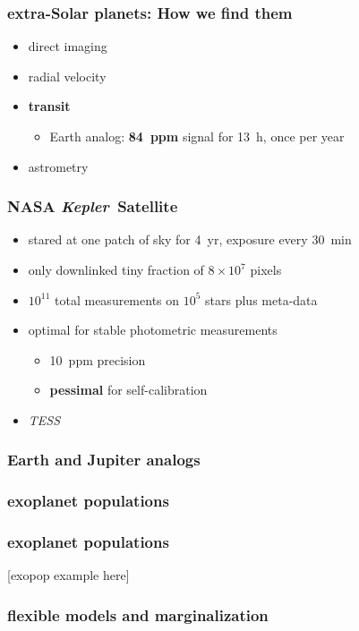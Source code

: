 \documentclass{beamer}
\renewcommand{\emph}[1]{\textbf{#1}}
\newcommand{\project}[1]{\textsl{#1}}
\newcommand{\Kepler}{\project{Kepler}}
\begin{document}
\begin{frame}
  \frametitle{extra-Solar planets: How we find them}
  \begin{itemize}
  \item direct imaging
  \item radial velocity
  \item \emph{transit}
    \begin{itemize}
    \item Earth analog: \emph{84~ppm} signal for 13~h, once per year
    \end{itemize}
  \item astrometry
  \end{itemize}
\end{frame}

\begin{frame}
  \frametitle{NASA \Kepler\ Satellite}
  \begin{itemize}
  \item stared at one patch of sky for 4~yr, exposure every 30~min
  \item only downlinked tiny fraction of $8\times 10^7$ pixels
  \item $10^{11}$ total measurements on $10^5$ stars plus meta-data
  \item optimal for stable photometric measurements
    \begin{itemize}
    \item 10~ppm precision
    \item \emph{pessimal} for self-calibration
    \end{itemize}
  \item \project{TESS}
  \end{itemize}
\end{frame}

\begin{frame}
  \frametitle{Earth and Jupiter analogs}
\end{frame}

\begin{frame}
  \frametitle{exoplanet populations}
\end{frame}

\begin{frame}
  \frametitle{exoplanet populations}
  [exopop example here]
\end{frame}

\begin{frame}
  \frametitle{flexible models and marginalization}
\end{frame}
\end{document}

